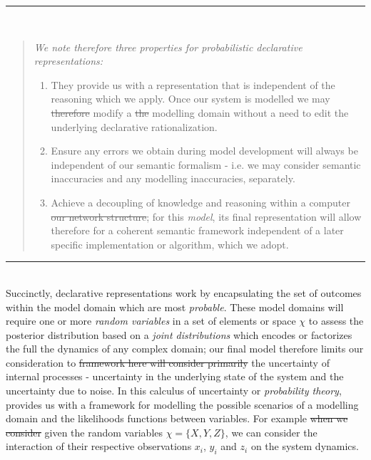 \documentclass[7pt]{article}
\newenvironment{itquote}
	{\begin{quote}\itshape}
		{\end{quote}\ignorespacesafterend}
\begin{document}
\noindent\rule{7cm}{1.7pt}\\
\begin{itquote}
{We note therefore three properties for probabilistic declarative representations:}
\begin{enumerate}
	\item They provide us with a representation that is independent of the reasoning which we apply.  Once our system is modelled we may \st{therefore} modify a \st{the} modelling domain without a need to edit the underlying declarative rationalization.
	\item Ensure any errors we obtain during model development will always be independent of our semantic formalism - i.e. we may consider semantic inaccuracies and any modelling inaccuracies, separately.  
	\item Achieve a decoupling of knowledge and reasoning within a computer \st{our network structure}; for this \emph{model}, its final representation will allow therefore for a coherent semantic framework independent of a later specific implementation or algorithm, which we adopt. 
\end{enumerate}
\end{itquote}
\noindent\rule{7cm}{1.7pt}\\
Succinctly, declarative representations work by encapsulating the set of outcomes within the model domain which are most \emph{probable}. These model domains will require one or more  \emph{random variables} in a set of elements or  space $\chi$  to assess the posterior distribution based on a \emph{joint distributions} which encodes or factorizes the full the dynamics of any complex domain; our final model therefore limits our consideration to \st{framework here will consider primarily} the uncertainty of internal processes - uncertainty in the underlying state of the system and the uncertainty due to noise. In this calculus of uncertainty or \emph{probability theory}, provides us with a framework for modelling the possible scenarios of a modelling domain and the likelihoods functions between variables. For example  \st{when we consider} given the random variables $\chi = \{X,Y, Z\}$, we can consider the interaction of their respective observations $x_i$, $y_i$ and $z_i$ on the system dynamics.  
 
 
\end{document}
